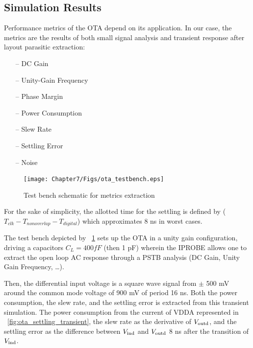 \subsection{Simulation Results}              %
\label{sec:ota-sim-result}
Performance metrics of the OTA depend on its application. In our case, the metrics are the results of both small signal analysis and transient response after layout parasitic extraction:
\begin{multicols}{2}
    \begin{itemize}
        \itemsep-0.5em
        \item[--] DC Gain
        \item[--] Unity-Gain Frequency
        \item[--] Phase Margin
        \item[--] Power Consumption
        \item[--] Slew Rate
        \item[--] Settling Error
        \item[--] Noise
    \end{itemize}
\end{multicols}

\begin{figure}[htp]
    \centering
    \texttt{[image: Chapter7/Figs/ota\_testbench.eps]}
    \caption{Test bench schematic for metrics extraction}
    \label{fig:ota_testbench}
\end{figure}

For the sake of simplicity, the allotted time for the settling is defined by (\(T_{clk} - T_{nonoverlap} - T_{digital}\)) which approximates 8 ns in worst cases.

The test bench depicted by \figurename~\ref{fig:ota_testbench} sets up the OTA in a unity gain configuration, driving a capacitors \(C_L = 400 fF\) (then 1 pF) wherein the IPROBE allows one to extract the open loop AC response through a PSTB analysis (DC Gain, Unity Gain Frequency, \ldots).

Then, the differential input voltage is a square wave signal from \(\pm\) 500 mV around the common mode voltage of 900 mV of period 16 ns. Both the power consumption, the slew rate, and the settling error is extracted from this transient simulation. The power consumption from the current of VDDA represented in \figurename~\ref{fig:ota_settling_transient}, the slew rate as the derivative of $V_{\rm outd}$, and the settling error as the difference between $V_{\rm ind}$ and $V_{\rm outd}$ 8 ns after the transition of $V_{\rm ind}$.

